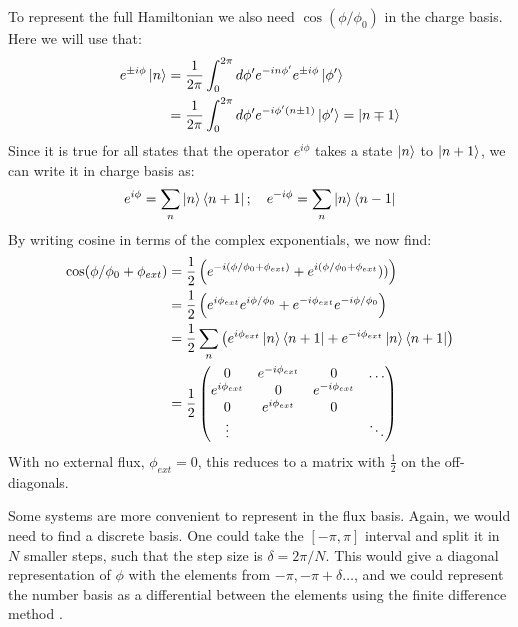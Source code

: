 To represent the full Hamiltonian we also need $\cos(\phi / \phi_0)$ in the charge basis. Here we will use that:
\begin{align*}
    e^{\pm i \phi}\ket{n} &=  \frac{1}{2\pi} \int_0^{2\pi} d \phi' e^{-in\phi'} e^{\pm i \phi}\ket{\phi'} \\
                          &=  \frac{1}{2\pi} \int_0^{2\pi} d \phi' e^{-i\phi'(n\pm 1)} \ket{\phi'} = \ket{n\mp 1}    
\end{align*}
Since it is true for all states that the operator $e^{i\phi}$ takes a state $\ket{n}$ to $\ket{n+1}$, we can write it in charge basis as:
\begin{equation}
    e^{i\phi} = \sum_n \ket{n}\bra{n+1}; \quad e^{-i\phi} = \sum_n  \ket{n}\bra{n-1}
\end{equation}
By writing cosine in terms of the complex exponentials, we now find:
\begin{align}
    \cos(\phi/\phi_0 + \phi_{ext}) &= \frac12 \left(e^{-i(\phi/\phi_0 + \phi_{ext})} + e^{i(\phi/\phi_0 + \phi_{ext}}))\right) \nonumber\\
    &= \frac12 \left(e^{i\phi_{ext}}e^{i\phi/\phi_0} + e^{-i\phi_{ext}}e^{-i\phi/\phi_0}\right)  \nonumber \\
    &= \frac12 \sum_n \left(e^{i\phi_{ext}} \ket{n}\bra{n + 1} + e^{-i\phi_{ext}} \ket{n}\bra{n+ 1}   \right) \nonumber \\
    &= \frac12 \begin{pmatrix}
        0 & e^{-i\phi_{ext}} & 0 & \hdots \\
        e^{i\phi_{ext}} & 0 & e^{-i\phi_{ext}} \\
        0 & e^{i\phi_{ext}} & 0 & \\
        \vdots & & & \ddots 
    \end{pmatrix}
\end{align}
With no external flux, $\phi_{ext} = 0$, this reduces to a matrix with $\frac12$ on the off-diagonals.

Some systems are more convenient to represent in the flux basis. Again, we would need to find a discrete basis. One could take the $[-\pi, \pi]$ interval and split it in $N$ smaller steps, such that the step size is $\delta = 2\pi/N$. This would give a diagonal representation of $\phi$ with the elements from $-\pi, -\pi + \delta \dots$, and we could represent the number basis as a differential between the elements using the finite difference method \cite{aumann_circuitq_2022}.

